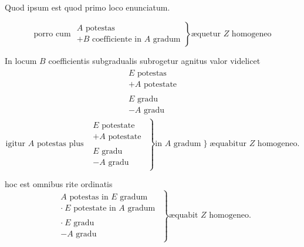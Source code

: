 \documentclass[11pt,a4paper]{article}
\begin{document}

Quod ipsum est quod primo loco enunciatum.

\[ \text{porro cum } \left.\begin{array}{l} A \text{ potestas} \\ + B \text{ coefficiente in } A \text{ gradum} \end{array}\right\} \text{æquetur } Z \text{ homogeneo} \]

In locum $B$ coefficientis subgradualis subrogetur agnitus valor videlicet
\[ \begin{array}{c} \begin{array}{l} E \text{ potestas} \\ + A \text{ potestate} \end{array} \\ \hline \begin{array}{l} E \text{ gradu} \\ - A \text{ gradu} \end{array} \end{array} \]
\[ \text{igitur } A \text{ potestas plus } \left.\begin{array}{c} \begin{array}{l} E \text{ potestate} \\ + A \text{ potestate} \end{array} \\ \hline \begin{array}{l} E \text{ gradu} \\ - A \text{ gradu} \end{array} \end{array}\right\} \text{in } A \text{ gradum} \;\Big\}\; \text{æquabitur } Z \text{ homogeneo.} \]

hoc est omnibus rite ordinatis
\[ \left.\begin{array}{c} \begin{array}{l} A \text{ potestas in } E \text{ gradum} \\ \cdot\ E \text{ potestate in } A \text{ gradum} \end{array} \\ \hline \begin{array}{l} \cdot\ E \text{ gradu} \\ - A \text{ gradu} \end{array} \end{array}\right\} \text{æquabit } Z \text{ homogeneo.} \]
\end{document}
